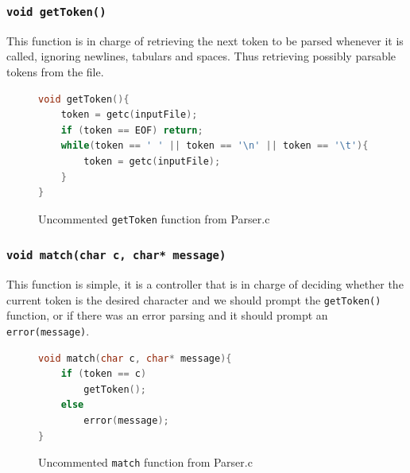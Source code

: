 \documentclass{article}
\begin{document}
\subsubsection{\texttt{void getToken()}}
This function is in charge of retrieving the next token to be parsed whenever it is called, ignoring newlines, tabulars and spaces. Thus retrieving possibly parsable tokens from the file.
\begin{figure}[H]
    \begin{lstlisting}[language=C]
void getToken(){
    token = getc(inputFile);
    if (token == EOF) return; 
    while(token == ' ' || token == '\n' || token == '\t'){
        token = getc(inputFile);
    }
}
    \end{lstlisting}
    \caption{Uncommented \texttt{getToken} function from Parser.c}
\end{figure}
\subsubsection{\texttt{void match(char c, char* message)}} 
This function is simple, it is a controller that is in charge of deciding whether the current token is the desired character and we should prompt the \texttt{getToken()} function, or if there was an error parsing and it should prompt an \texttt{error(message)}.
\begin{figure}[H]
    \begin{lstlisting}[language=C]
void match(char c, char* message){
    if (token == c) 
        getToken();
    else 
        error(message);
}
    \end{lstlisting}
    \caption{Uncommented \texttt{match} function from Parser.c}
\end{figure}
\end{document}
